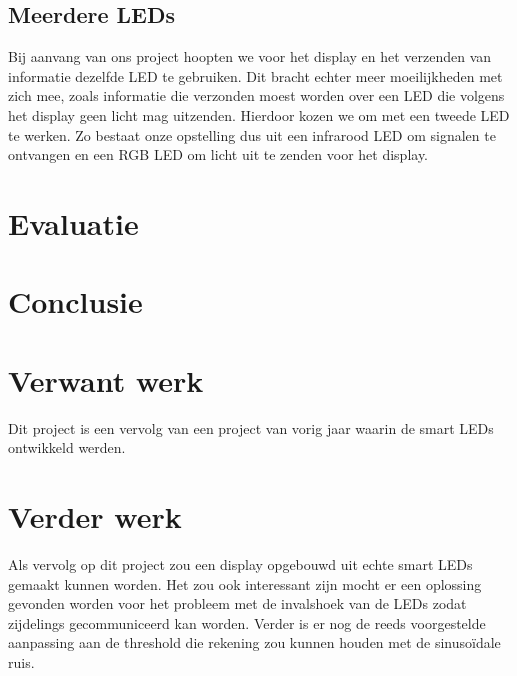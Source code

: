 \documentclass{article}
\begin{document}
\subsection{Meerdere LEDs}
Bij aanvang van ons project hoopten we voor het display en het verzenden van informatie dezelfde LED te gebruiken. Dit bracht echter meer moeilijkheden met zich mee, zoals informatie die verzonden moest worden over een LED die volgens het display geen licht mag uitzenden. Hierdoor kozen we om met een tweede LED te werken. Zo bestaat onze opstelling dus uit een infrarood LED om signalen te ontvangen en een RGB LED om licht uit te zenden voor het display.


\section{Evaluatie}


\section{Conclusie}


\section{Verwant werk}
Dit project is een vervolg van een project van vorig jaar waarin de smart LEDs ontwikkeld werden. 


\section{Verder werk}
Als vervolg op dit project zou een display opgebouwd uit echte smart LEDs gemaakt kunnen worden. Het zou ook interessant zijn mocht er een oplossing gevonden worden voor het probleem met de invalshoek van de LEDs zodat zijdelings gecommuniceerd kan worden. Verder is er nog de reeds voorgestelde aanpassing aan de threshold die rekening zou kunnen houden met de sinusoïdale ruis.


%
%
\end{document}
